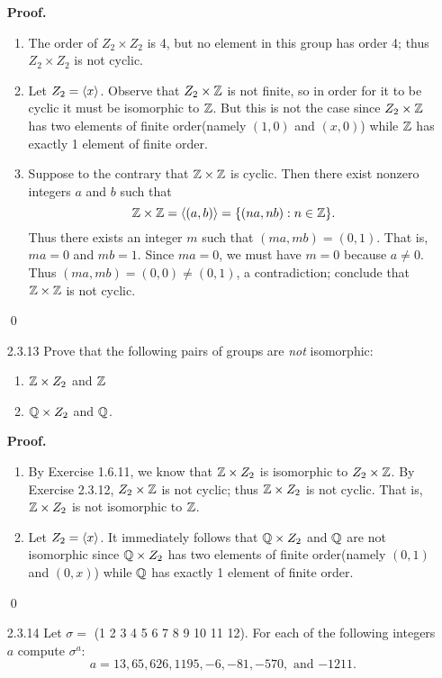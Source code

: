 \begin{enumerate}
      \textbf{Proof.}
      \begin{enumerate}
         \item The order of $Z_2 \times Z_2$ is 4, but no element in this group
               has order 4; thus $Z_2 \times Z_2$ is not cyclic.
         \item Let $Z_2 = \langle x \rangle$. Observe that $Z_2 \times \mathbb{Z}$ is not finite,
               so in order for it to be cyclic it must be isomorphic to $\mathbb{Z}$.
               But this is not the case since $Z_2 \times \mathbb{Z}$ has two elements
               of finite order(namely $(1, 0)$ and $(x, 0)$) while $\mathbb{Z}$ has
               exactly 1 element of finite order.
         \item Suppose to the contrary that $\mathbb{Z} \times \mathbb{Z}$ is cyclic. Then there
               exist nonzero integers $a$ and $b$ such that
               $$\mathbb{Z} \times \mathbb{Z} = \langle (a,b) \rangle = \{(na, nb) : n \in \mathbb{Z}\}.$$
               Thus there exists an integer $m$ such that
               $(ma, mb) = (0, 1)$. That is, $ma = 0$ and $mb = 1$. Since
               $ma = 0$, we must have $m = 0$ because $a \neq 0$. Thus
               $(ma, mb) = (0, 0) \neq (0, 1)$, a contradiction; conclude that
               $\mathbb{Z} \times \mathbb{Z}$ is not cyclic.
      \end{enumerate} \qed
   \item[2.3.13]  Prove that the following pairs of groups are \textit{not}
                  isomorphic:
                  \begin{enumerate}
                     \item $\mathbb{Z} \times Z_2$ and $\mathbb{Z}$
                     \item $\mathbb{Q} \times Z_2$ and $\mathbb{Q}$.
                  \end{enumerate}
      
      \textbf{Proof.}
      \begin{enumerate}
         \item By Exercise 1.6.11, we know that $\mathbb{Z} \times Z_2$ is isomorphic to
               $Z_2 \times \mathbb{Z}$. By Exercise 2.3.12, $Z_2 \times \mathbb{Z}$ is not
               cyclic; thus $\mathbb{Z} \times Z_2$ is not cyclic. That is,
               $\mathbb{Z} \times Z_2$ is not isomorphic to $\mathbb{Z}$.
         \item Let $Z_2 = \langle x \rangle$. It immediately follows that
               $\mathbb{Q} \times Z_2$ and $\mathbb{Q}$ are not isomorphic since $\mathbb{Q} \times Z_2$
               has two elements of finite order(namely $(0, 1)$ and $(0, x)$)
               while $\mathbb{Q}$ has exactly 1 element of finite order.
      \end{enumerate} \qed
   \item[2.3.14]  Let $\sigma =$ (1 2 3 4 5 6 7 8 9 10 11 12). For each of the
                  following integers $a$ compute $\sigma^a$:
                  $$a = 13, 65, 626, 1195, -6, -81, -570,\text{ and } {-1211}.$$
                  

\end{enumerate}
